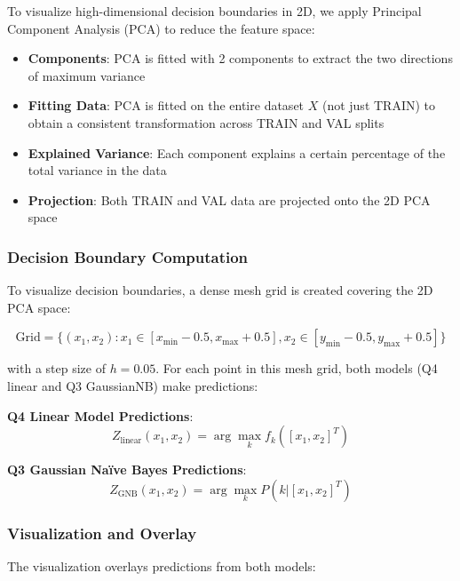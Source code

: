 \documentclass[12pt]{article}
\begin{document}
To visualize high-dimensional decision boundaries in 2D, we apply Principal Component Analysis (PCA) to reduce the feature space:

\begin{itemize}
    \item \textbf{Components}: PCA is fitted with 2 components to extract the two directions of maximum variance
    \item \textbf{Fitting Data}: PCA is fitted on the entire dataset $X$ (not just TRAIN) to obtain a consistent transformation across TRAIN and VAL splits
    \item \textbf{Explained Variance}: Each component explains a certain percentage of the total variance in the data
    \item \textbf{Projection}: Both TRAIN and VAL data are projected onto the 2D PCA space
\end{itemize}

\subsubsection{Decision Boundary Computation}

To visualize decision boundaries, a dense mesh grid is created covering the 2D PCA space:

\begin{equation}
\text{Grid} = \{(x_1, x_2) : x_1 \in [x_{\min} - 0.5, x_{\max} + 0.5], x_2 \in [y_{\min} - 0.5, y_{\max} + 0.5]\}
\end{equation}

with a step size of $h = 0.05$. For each point in this mesh grid, both models (Q4 linear and Q3 GaussianNB) make predictions:

\textbf{Q4 Linear Model Predictions}:
\begin{equation}
Z_{\text{linear}}(x_1, x_2) = \arg\max_k f_k([x_1, x_2]^T)
\end{equation}

\textbf{Q3 Gaussian Naïve Bayes Predictions}:
\begin{equation}
Z_{\text{GNB}}(x_1, x_2) = \arg\max_k P(k | [x_1, x_2]^T)
\end{equation}

\subsubsection{Visualization and Overlay}

The visualization overlays predictions from both models:
\end{document}
